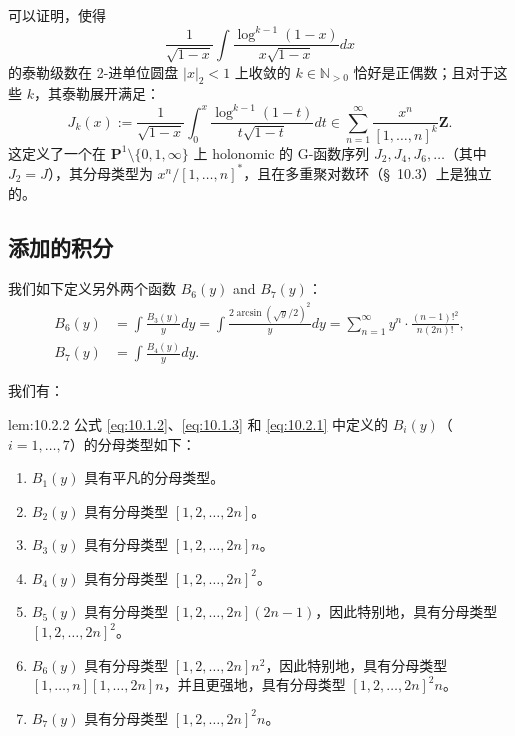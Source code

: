 \setcounter{equation}{7}
\begin{remark}\label{rem:10.1.8}
可以证明，使得
\begin{equation}\label{eq:10.1.9}\tag{10.1.9}
\frac{1}{\sqrt{1-x}} \int \frac{\log^{k-1}(1-x)}{x\sqrt{1-x}} dx
\end{equation}
的泰勒级数在 2-进单位圆盘 $|x|_2 < 1$ 上收敛的 $k \in \mathbb{N}_{>0}$ 恰好是正偶数；且对于这些 $k$，其泰勒展开满足：
\[ J_k(x) := \frac{1}{\sqrt{1-x}} \int_0^x \frac{\log^{k-1}(1-t)}{t\sqrt{1-t}} dt \in \sum_{n=1}^{\infty} \frac{x^n}{[1,\dots,n]^k} \mathbf{Z}. \]
这定义了一个在 $\mathbf{P}^1 \setminus \{0, 1, \infty\}$ 上 holonomic 的 G-函数序列 $J_2, J_4, J_6, \dots$（其中 $J_2 = J$），其分母类型为 $x^n/[1, \dots, n]^*$，且在多重聚对数环（\S~10.3）上是独立的。
\end{remark}

\subsection{添加的积分}\label{sec:10.2}

我们如下定义另外两个函数 $B_6(y)$ and $B_7(y)$：
\begin{equation}\label{eq:10.2.1}\tag{10.2.1}
\begin{aligned}
B_6(y) &= \int \frac{B_3(y)}{y} dy = \int \frac{2\arcsin(\sqrt{y}/2)^2}{y} dy = \sum_{n=1}^{\infty} y^n \cdot \frac{(n-1)!^2}{n(2n)!}, \\
B_7(y) &= \int \frac{B_4(y)}{y} dy.
\end{aligned}
\end{equation}

我们有：
\setcounter{equation}{1}
\begin{mylemma}{}{lem:10.2.2}
公式 \eqref{eq:10.1.2}、\eqref{eq:10.1.3} 和 \eqref{eq:10.2.1} 中定义的 $B_i(y)$（$i = 1, \dots, 7$）的分母类型如下：
\begin{enumerate}
\item[(1)] $B_1(y)$ 具有平凡的分母类型。
\item[(2)] $B_2(y)$ 具有分母类型 $[1, 2, \dots, 2n]$。
\item[(3)] $B_3(y)$ 具有分母类型 $[1, 2, \dots, 2n]n$。
\item[(4)] $B_4(y)$ 具有分母类型 $[1, 2, \dots, 2n]^2$。
\item[(5)] $B_5(y)$ 具有分母类型 $[1, 2, \dots, 2n](2n-1)$，因此特别地，具有分母类型 $[1, 2, \dots, 2n]^2$。
\item[(6)] $B_6(y)$ 具有分母类型 $[1, 2, \dots, 2n]n^2$，因此特别地，具有分母类型 $[1, \dots, n][1, \dots, 2n]n$，并且更强地，具有分母类型 $[1, 2, \dots, 2n]^2 n$。
\item[(7)] $B_7(y)$ 具有分母类型 $[1, 2, \dots, 2n]^2 n$。
\end{enumerate}
\end{mylemma}


